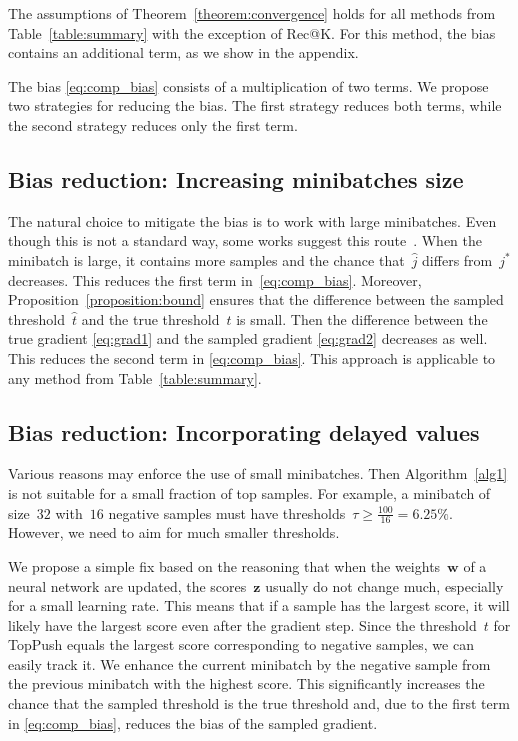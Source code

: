 The assumptions of Theorem~\ref{theorem:convergence} holds for all methods from Table~\ref{table:summary} with the exception of Rec@K. For this method, the bias contains an additional term, as we show in the appendix.

The bias \eqref{eq:comp_bias} consists of a multiplication of two terms. We propose two strategies for reducing the bias. The first strategy reduces both terms, while the second strategy reduces only the first term.

\subsection{Bias reduction: Increasing minibatches size}\label{sec:bias1}

The natural choice to mitigate the bias is to work with large minibatches. Even though this is not a standard way, some works suggest this route~\cite{you2019large}. When the minibatch is large, it contains more samples and the chance that~$\hat j$ differs from~$j^*$ decreases. This reduces the first term in~\eqref{eq:comp_bias}. Moreover, Proposition~\ref{proposition:bound} ensures that the difference between the sampled threshold~$\hat t$ and the true threshold~$t$ is small. Then the difference between the true gradient \eqref{eq:grad1} and the sampled gradient \eqref{eq:grad2} decreases as well. This reduces the second term in \eqref{eq:comp_bias}. This approach is applicable to any method from Table~\ref{table:summary}.

\subsection{Bias reduction: Incorporating delayed values}\label{sec:bias2}

Various reasons may enforce the use of small minibatches. Then Algorithm~\ref{alg1} is not suitable for a small fraction of top samples. For example, a minibatch of size~$32$ with~$16$ negative samples must have thresholds~$\tau\geq \frac{100}{16}=6.25\%$. However, we need to aim for much smaller thresholds.

We propose a simple fix based on the reasoning that when the weights~$\bm{w}$ of a neural network are updated, the scores~$\bm{z}$ usually do not change much, especially for a small learning rate. This means that if a sample has the largest score, it will likely have the largest score even after the gradient step. Since the threshold~$t$ for TopPush equals the largest score corresponding to negative samples, we can easily track it. We enhance the current minibatch by the negative sample from the previous minibatch with the highest score. This significantly increases the chance that the sampled threshold is the true threshold and, due to the first term in \eqref{eq:comp_bias}, reduces the bias of the sampled gradient.

